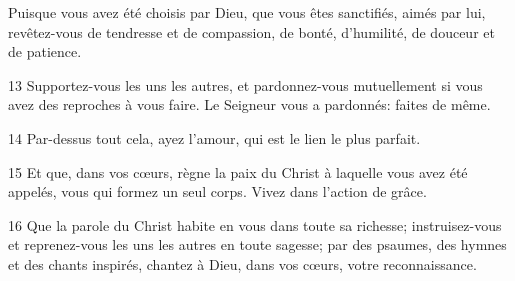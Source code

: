 Puisque vous avez été choisis par Dieu, que vous êtes sanctifiés, aimés par lui, revêtez-vous de tendresse et de compassion, de bonté, d’humilité, de douceur et de patience.

13 Supportez-vous les uns les autres, et pardonnez-vous mutuellement si vous avez des reproches à vous faire. Le Seigneur vous a pardonnés: faites de même.

14 Par-dessus tout cela, ayez l’amour, qui est le lien le plus parfait.

15 Et que, dans vos cœurs, règne la paix du Christ à laquelle vous avez été appelés, vous qui formez un seul corps. Vivez dans l’action de grâce.

16 Que la parole du Christ habite en vous dans toute sa richesse; instruisez-vous et reprenez-vous les uns les autres en toute sagesse; par des psaumes, des hymnes et des chants inspirés, chantez à Dieu, dans vos cœurs, votre reconnaissance.